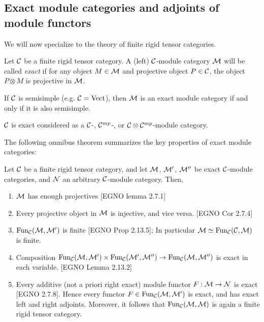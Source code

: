 \documentclass{amsart}
\begin{document}



\subsection{Exact module categories and adjoints of module functors}
We will now specialize to the theory of finite rigid tensor categories. 

\begin{definition}
	Let $\mathcal C$ be a finite rigid tensor category. A (left) $\mathcal C$-module category $\mathcal M$ will be called {\em exact} if for any object $M \in \mathcal M$ and  projective object $P \in \mathcal C$, the object $P \otimes M$ is projective in $\mathcal M$. 
\end{definition}

\begin{example}
	If $\mathcal C$ is semisimple (e.g. $\mathcal C = \mathrm{Vect}$), then $\mathcal M$ is an exact module category if and only if it is also semisimple.
\end{example}

\begin{example}
	$\mathcal C$ is exact considered as a $\mathcal C$-, $\mathcal C^{mp}$-, or $\mathcal C \otimes \mathcal C^{mp}$-module category. 
\end{example}

The following omnibus theorem summarizes the key properties of exact module categories: 
\begin{theorem}[ENGO] \label{Thm:ExactModCatOmnibus}
	Let $\mathcal C$ be a finite rigid tensor category, and let $\mathcal M$, $\mathcal M'$, $\mathcal M''$ be exact $\mathcal C$-module categories, and $\mathcal N$ an arbitrary $\mathcal C$-module category. Then,
	\begin{enumerate}
		\item $\mathcal M$ has enough projectives [EGNO lemma 2.7.1]
		\item Every projective object in $\mathcal M$  is injective, and vice versa. [EGNO Cor 2.7.4]
		\item $\operatorname{Fun}_{\mathcal C}(\mathcal M, \mathcal M')$ is finite [EGNO Prop 2.13.5]; In particular $\mathcal M \simeq \operatorname{Fun}_{\mathcal C}(\mathcal C, \mathcal M)$ is finite.
		\item Composition $\operatorname{Fun}_{\mathcal C}(\mathcal M, \mathcal M') \times \operatorname{Fun}_{\mathcal C}(\mathcal M', \mathcal M'') \to \operatorname{Fun}_{\mathcal C}(\mathcal M, \mathcal M'')$ is exact in each variable. [EGNO Lemma 2.13.2]		
		\item Every additive (not a priori right exact) module functor $F:\mathcal M \to \mathcal N$ is exact [EGNO 2.7.8]. Hence every functor $F \in \operatorname{Fun}_{\mathcal C}(\mathcal M, \mathcal M')$ is exact, and has exact left and right adjoints. Moreover, it follows that   $\operatorname{Fun}_{\mathcal C}(\mathcal M,\mathcal M)$ is again a finite rigid tensor category. 
	\end{enumerate}
\end{theorem}
\end{document}
